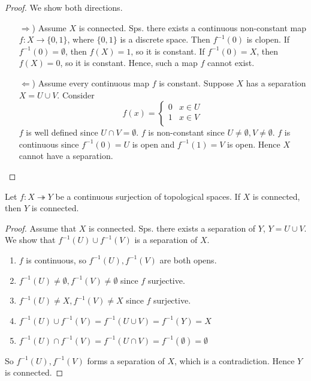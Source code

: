 \begin{proof}
  We show both directions.
  \begin{enumerate}
     \item[\( \Rightarrow \))]
        Assume \( X \) is connected.
        Sps. there exists a continuous non-constant map
        \( f: X \to \{ 0, 1 \} \), where
        \( \{ 0, 1  \}  \) is a discrete space.
        Then \( {f}^{-1} (0) \) is clopen.
        If \( {f}^{-1} (0) = \emptyset \), then \( f(X) = 1 \), so it is constant.
        If \( {f}^{-1} (0) = X \), then \( f(X) = 0 \), so it is constant.
        Hence, such a map \( f \) cannot exist.
     \item[\( \Leftarrow \))]
       Assume every continuous map \( f \) is constant.
       Suppose \( X \) has a separation \( X = U \cup V \).
       Consider
       \[
        f(x) = \begin{cases}
          0 & x \in U \\ 
          1 & x \in V \\ 
        \end{cases}
       \]
        \( f \) is well defined since \( U \cap V = \emptyset \).
        \( f \) is non-constant since \( U \neq \emptyset, V \neq \emptyset \).
        \( f \) is continuous since \( {f}^{-1} (0) = U \) is open
        and  \( {f}^{-1} (1) = V  \) is open.
        Hence \( X \) cannot have a separation.
  \end{enumerate}
\end{proof}

\begin{proposition}
    Let \( f: X \twoheadrightarrow Y\) be a continuous surjection of topological spaces.
    If \( X \) is connected, then \( Y \) is connected.
\end{proposition}

\begin{proof}
   Assume that \( X \) is connected.
   Sps. there exists a separation of \( Y \), \( Y = U \cup V  \).
   We show that \( {f}^{-1} (U) \cup {f}^{-1} (V) \) is a separation 
   of \( X \).

   \begin{enumerate}
       \item
         \( f \) is continuous, so \( {f}^{-1} (U), {f}^{-1} (V) \)
         are both opens.
       \item 
          \( {f}^{-1} (U) \neq \emptyset, {f}^{-1} (V) \neq \emptyset \)
          since \( f \) surjective.
        \item
          \( {f}^{-1} (U) \neq X, {f}^{-1} (V) \neq X \)
          since \( f \) surjective.
        \item 
          \( {f}^{-1} (U) \cup {f}^{-1} (V) = {f}^{-1} (U \cup V) = {f}^{-1} (Y) = X \)
        \item
          \( {f}^{-1} (U) \cap {f}^{-1} (V) = {f}^{-1} (U \cap V) = {f}^{-1} (\emptyset) = \emptyset \)
   \end{enumerate}
    So \( {f}^{-1} (U), {f}^{-1}(V) \) forms a separation of \( X \),
    which is a contradiction. Hence \( Y \) is connected.
\end{proof}

